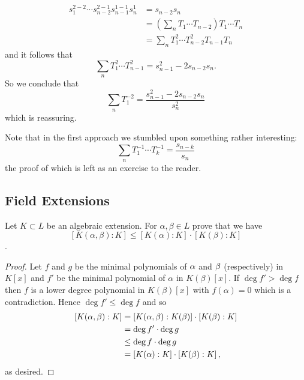 \begin{sol}
\begin{enumerate}
            \begin{align*}
                s_1^{2-2}\cdots s_{n-2}^{2-1}s_{n-1}^{1-1}s_n^1&=s_{n-2}s_n\\
                &=\left(\sum_n T_1\cdots T_{n-2}\right)T_1\cdots T_n\\
                &=\sum_n T_1^2\cdots T_{n-2}^2 T_{n-1}T_n
            \end{align*}
            and it follows that
            $$\sum_n T_1^2\cdots T_{n-1}^2 = s_{n-1}^2-2s_{n-2}s_n.$$
            So we conclude that
            $$ \sum_n T_1^{-2} = \frac{s_{n-1}^2-2s_{n-2}s_n}{s_n^2}$$
            which is reassuring.
        \end{enumerate}
        Note that in the first approach we stumbled upon something rather interesting:
        $$
            \sum_n T_1^{-1}\cdots T_k^{-1} = \frac{s_{n-k}}{s_n}
        $$
        the proof of which is left as an exercise to the reader.
    \end{sol}

    \begin{ex}{14.24}
        
    \end{ex}

\subsection{Field Extensions}
    \begin{ex}{21.18}
        Let $K\subset L$ be an algebraic extension. For $\alpha, \beta\in L$ prove that we have
        $$ \left[K(\alpha,\beta):K\right]\leq\left[K(\alpha):K\right]\cdot\left[K(\beta):K\right]$$.
    \end{ex}
    \begin{proof}
        Let $f$ and $g$ be the minimal polynomials of $\alpha$ and $\beta$ (respectively) in $K[x]$ and $f'$ be the minimal polynomial of $\alpha$ in $K(\beta)[x]$.
        If $\deg f'> \deg f$ then $f$ is a lower degree polynomial in $K(\beta)[x]$ with $f(\alpha)=0$ which is a contradiction. Hence $\deg f'\leq \deg f$ and so
        \begin{align*}
            \left[K(\alpha,\beta):K\right]&=\left[K(\alpha, \beta):K(\beta)\right]\cdot\left[K(\beta):K\right]\\
            &=\deg f'\cdot \deg g\\
            &\leq\deg f\cdot \deg g\\
            &=\left[K(\alpha):K\right]\cdot \left[K(\beta):K\right],   
        \end{align*}
        as desired.
    \end{proof}

